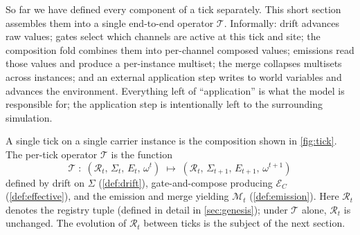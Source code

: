 \documentclass[journal,onecolumn,11pt]{IEEEtran}
\theoremstyle{definition}
\begin{document}
So far we have defined every component of a tick separately. This short section assembles them into a single end-to-end operator $\mathcal{T}$. Informally: drift advances raw values; gates select which channels are active at this tick and site; the composition fold combines them into per-channel composed values; emissions read those values and produce a per-instance multiset; the merge collapses multisets across instances; and an external application step writes to world variables and advances the environment. Everything left of ``application'' is what the model is responsible for; the application step is intentionally left to the surrounding simulation.

A single tick on a single carrier instance is the composition shown in \cref{fig:tick}. The per-tick operator $\mathcal{T}$ is the function
\[
\mathcal{T} \;:\; (\mathcal{R}_t,\, \Sigma_t,\, E_t,\, \omega^t) \;\longmapsto\; (\mathcal{R}_t,\, \Sigma_{t+1},\, E_{t+1},\, \omega^{t+1})
\]
defined by drift on $\Sigma$ (\cref{def:drift}), gate-and-compose producing $\mathcal{E}_C$ (\cref{def:effective}), and the emission and merge yielding $\mathcal{M}_t$ (\cref{def:emission}). Here $\mathcal{R}_t$ denotes the registry tuple (defined in detail in \cref{sec:genesis}); under $\mathcal{T}$ alone, $\mathcal{R}_t$ is unchanged. The evolution of $\mathcal{R}_t$ between ticks is the subject of the next section.
\end{document}
